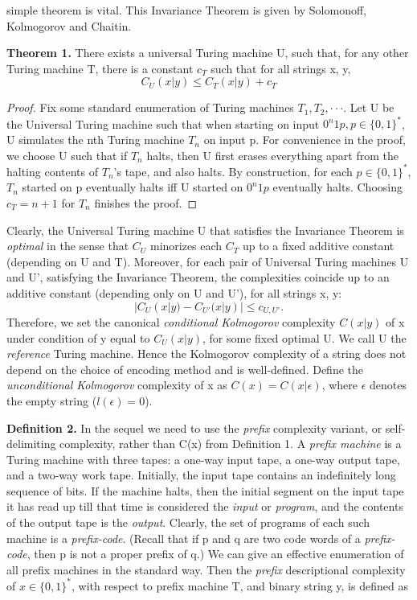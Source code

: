 \documentclass[12pt]{article}
\numberwithin{equation}{section}
\begin{document}
\clearpage
\normalsize
simple theorem is vital. This Invariance Theorem is given by  Solomonoff, Kolmogorov and Chaitin. \par
\textbf{Theorem 1.} There exists a universal Turing machine U, such that, for any other Turing machine T, there is a constant $c_T$ such that for all strings x, y, 
\begin{equation*}
	C_U(x|y) \le C_T(x|y) + c_T
\end{equation*} 
\begin{proof}
Fix some standard enumeration of Turing machines $T_1, T_2, \cdot \cdot \cdot$. Let U be the Universal Turing machine such that when starting on input $0^n 1 p, p \in \{0,1\}^*$, U simulates the nth Turing machine $T_n$ on input p. For convenience in the proof, we choose U such that if $T_n$ halts, then U first erases everything apart from the halting contents of $T_n$'s tape, and also halts. By construction, for each $p \in \{0,1\}^*$, $T_n$ started on p eventually halts iff U started on $0^n 1 p$ eventually halts. Choosing $c_T=n+1$ for $T_n$ finishes the proof.
\end{proof} \par
Clearly, the Universal Turing machine U that satisfies the Invariance Theorem is \textit{optimal} in the sense that $C_U$ minorizes each $C_T$ up to a fixed additive constant (depending on U and T). Moreover, for each pair of Universal Turing machines U and U', satisfying the Invariance Theorem, the complexities coincide up to an additive constant (depending only on U and U'), for all strings x, y: 
\begin{equation*}
	|C_U(x|y) - C_{U'}(x|y)| \le c_{U, U'}.
\end{equation*}
    Therefore, we set the canonical \textit{conditional Kolmogorov} complexity $C(x|y)$ of x under condition of y equal to $C_U(x|y)$, for some fixed optimal U. We call U the \textit{reference} Turing machine. Hence the Kolmogorov complexity of a string does not depend on the choice of encoding method and is well-defined. Define the \textit{unconditional Kolmogorov} complexity of x as $C(x)=C(x|\epsilon)$, where $\epsilon$ denotes the empty string ($l(\epsilon)=0$). \par
\textbf{Definition 2.} In the sequel we need to use the \textit{prefix} complexity variant, or self-delimiting complexity, rather than C(x) from Definition 1. A \textit{prefix machine} is a Turing machine with three tapes: a one-way input tape, a one-way output tape, and a two-way work tape. Initially, the input tape contains an indefinitely long sequence of bits. If the machine halts, then the initial segment on the input tape it has read up till that time is considered the \textit{input} or \textit{program}, and the contents of the output tape is the \textit{output}. Clearly, the set of programs of each such machine is a \textit{prefix-code}. (Recall that if p and q are two code words of a \textit{prefix-code}, then p is not a proper prefix of q.) We can give an effective enumeration of all prefix machines in the standard way. Then the \textit{prefix} descriptional complexity of $x \in \{0, 1\}^*$, with respect to prefix machine T, and binary string y, is defined as 
\end{document}
